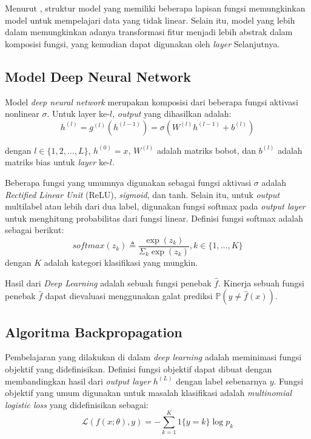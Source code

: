 Menurut \textcite{Bengio2021}, struktur model yang memiliki beberapa lapisan fungsi memungkinkan model untuk mempelajari data yang tidak linear. Selain itu, model yang lebih dalam memungkinkan adanya transformasi fitur menjadi lebih abstrak dalam komposisi fungsi, yang kemudian dapat digunakan oleh \emph{layer} Selanjutnya.

\subsection{Model Deep Neural Network}
Model \emph{deep neural network} merupakan komposisi dari beberapa fungsi aktivasi nonlinear $\sigma$. Untuk layer ke-$l$, \emph{output} yang dihasilkan adalah:
\begin{equation}
  h^{(l)} = g^{(l)}(h^{(l-1)}) = \sigma(W^{(l)}h^{(l-1)} + b^{(l)})
\end{equation}

dengan $l \in \{1,2,\dots,L\}$, $h^{(0)} = x$, $W^{(l)}$ adalah matriks bobot, dan $b^{(l)}$ adalah matriks bias untuk \emph{layer} ke-$l$.

Beberapa fungsi yang umumnya digunakan sebagai fungsi aktivasi $\sigma$ adalah \emph{Rectified Linear Unit} (ReLU), \emph{sigmoid}, dan tanh. Selain itu, untuk \emph{output} multilabel atau lebih dari dua label, digunakan fungsi softmax pada \emph{output layer} untuk menghitung probabilitas dari fungsi linear. Definisi fungsi softmax adalah sebagai berikut:
\begin{equation}
  softmax(z_k) \triangleq \frac{\exp(z_k)}{\Sigma_k \exp(z_k)},
  k \in \{1,\dots,K\}
\end{equation}
dengan $K$ adalah kategori klasifikasi yang mungkin.

Hasil dari \emph{Deep Learning} adalah sebuah fungsi penebak $\hat{f}$. Kinerja sebuah fungsi penebak $\hat{f}$ dapat dievaluasi menggunakan galat prediksi $\mathbb{P}(y \neq \hat{f}(x))$.

\subsection{Algoritma Backpropagation}
Pembelajaran yang dilakukan di dalam \emph{deep learning} adalah meminimasi fungsi objektif yang didefinisikan. Definisi fungsi objektif dapat dibuat dengan membandingkan hasil dari \emph{output layer} $h^{(L)}$ dengan label sebenarnya $y$. Fungsi objektif yang umum digunakan untuk masalah klasifikasi adalah \emph{multinomial logistic loss} yang didefinisikan sebagai:
\begin{equation}
  \mathcal{L}(f(x;\theta),y) = -\sum_{k=1}^K 1\{y=k\} \log p_k
\end{equation}

